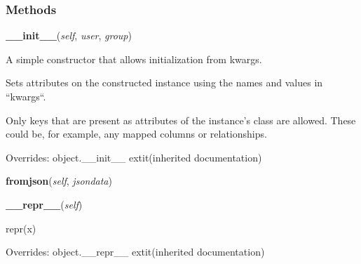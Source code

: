 
  \subsubsection{Methods}

    \vspace{0.5ex}

\hspace{.8\funcindent}\begin{boxedminipage}{\funcwidth}

    \raggedright \textbf{\_\_init\_\_}(\textit{self}, \textit{user}, \textit{group})

\setlength{\parskip}{2ex}
    A simple constructor that allows initialization from kwargs.

    Sets attributes on the constructed instance using the names and values 
    in ``kwargs``.

    Only keys that are present as attributes of the instance's class are 
    allowed. These could be, for example, any mapped columns or 
    relationships.

\setlength{\parskip}{1ex}
      Overrides: object.\_\_init\_\_ 	extit{(inherited documentation)}

    \end{boxedminipage}

    \label{db_layer:Groups:fromjson}

    \vspace{0.5ex}

\hspace{.8\funcindent}\begin{boxedminipage}{\funcwidth}

    \raggedright \textbf{fromjson}(\textit{self}, \textit{jsondata})

\setlength{\parskip}{2ex}
\setlength{\parskip}{1ex}
    \end{boxedminipage}

    \vspace{0.5ex}

\hspace{.8\funcindent}\begin{boxedminipage}{\funcwidth}

    \raggedright \textbf{\_\_repr\_\_}(\textit{self})

\setlength{\parskip}{2ex}
    repr(x)

\setlength{\parskip}{1ex}
      Overrides: object.\_\_repr\_\_ 	extit{(inherited documentation)}

    \end{boxedminipage}

